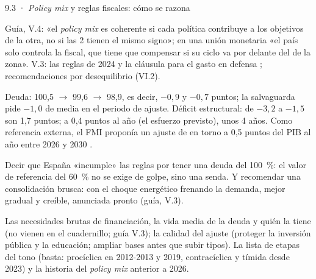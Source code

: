\begin{complemento}{9.3 · \emph{Policy mix} y reglas fiscales: cómo se razona}
\begin{figuracaja}
\caption{Los 4 cuadrantes del \emph{policy mix} (infografía de la guía)}\label{fig:policy-mix}
\end{figuracaja}

 Guía, V.4: «el \emph{policy mix} es coherente si cada política contribuye a los objetivos de la otra, no si las 2 tienen el mismo signo»; en una unión monetaria «el país solo controla la fiscal, que tiene que compensar si su ciclo va por delante del de la zona». V.3: las reglas de 2024 \parencite{RegUE2024Preventivo,RegUE2024Correctivo} y la cláusula para el gasto en defensa \parencite{CE2025Defensa}; recomendaciones por desequilibrio (VI.2).

 Deuda: 100,5 $\to$ 99,6 $\to$ 98,9, es decir, $-0{,}9$ y $-0{,}7$ puntos; la salvaguarda pide $-1{,}0$ de media en el periodo de ajuste. Déficit estructural: de $-3{,}2$ a $-1{,}5$ son 1,7 puntos; a 0,4 puntos al año (el esfuerzo previsto), unos 4 años. Como referencia externa, el FMI proponía un ajuste de en torno a 0,5 puntos del PIB al año entre 2026 y 2030 \parencite{FMI2026ArticuloIV}.

 Decir que España «incumple» las reglas por tener una deuda del 100~\%: el valor de referencia del 60~\% no se exige de golpe, sino una senda. Y recomendar una consolidación brusca: con el choque energético frenando la demanda, mejor gradual y creíble, anunciada pronto (guía, V.3).

 Las necesidades brutas de financiación, la vida media de la deuda y quién la tiene (no vienen en el cuadernillo; guía V.3); la calidad del ajuste (proteger la inversión pública y la educación; ampliar bases antes que subir tipos).  La lista de etapas del tono (basta: procíclica en 2012-2013 y 2019, contracíclica y tímida desde 2023) y la historia del \emph{policy mix} anterior a 2026.
\end{complemento}
